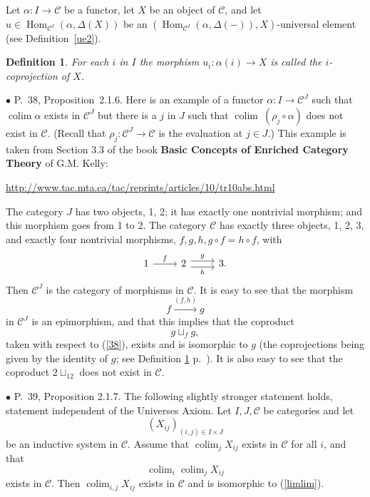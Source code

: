 \documentclass[12pt]{article}
\newtheorem{df}[thm]{Definition}%
\theoremstyle{remark}%
\newcommand{\bu}{\bullet}
\newcommand{\n}{\noindent}
\newcommand{\C}{\mathcal C}
\newcommand{\pr}{Proposition}
\DeclareMathOperator*{\coli}{colim}
\DeclareMathOperator*{\co}{colim}
\DeclareMathOperator{\h}{Hom}
\begin{document}
Let $\alpha:I\to\C$ be a functor, let $X$ be an object of $\C$, and let $u\in\h_{\C^I}(\alpha,\Delta(X))$ be an $(\h_{\C^I}(\alpha,\Delta(-)),X)$-universal element (see Definition~\ref{ue2}). 
%
\begin{df}\label{c}
For each $i$ in $I$ the morphism $u_i:\alpha(i)\to X$ is called the $i$-{\em coprojection} of $X$.
\end{df}


\n$\bu$ P.~38, \pr\ 2.1.6. Here is an example of a functor $\alpha:I\to\C^J$ such that $\co\alpha$ exists in $\C^J$ but there is a $j$ in $J$ such that $\co\ (\rho_j\circ\alpha)$ does not exist in $\C$. (Recall that $\rho_j:\C^J\to\C$ is the evaluation at $j\in J$.) This example is taken from Section 3.3 of the book \textbf{Basic Concepts of Enriched Category Theory} of G.M. Kelly:\medskip 

\centerline{\href{http://www.tac.mta.ca/tac/reprints/articles/10/tr10abs.html}{http://www.tac.mta.ca/tac/reprints/articles/10/tr10abs.html}}

The category $J$ has two objects, 1, 2; it has exactly one nontrivial morphism; and this morphism goes from 1 to 2. The category $\C$ has exactly three objects, 1, 2, 3, and exactly four nontrivial morphisms, $f,g,h,g\circ f=h\circ f$, with 
$$
\begin{tikzcd}
1\ar{r}{f}&2\ar[yshift=.7ex]{r}{g}\ar[yshift=-.7ex]{r}[swap]{h}&3.
\end{tikzcd}
$$ 
Then $\C^J$ is the category of morphisms in $\C$. It is easy to see that the morphism 
%
\begin{equation}\label{38}
f\xrightarrow{(f,h)}g 
\end{equation}
%
in $\C^J$ is an epimorphism, and that this implies that the coproduct 
$$
g\sqcup_fg,
$$ 
taken with respect to (\ref{38}), exists and is isomorphic to $g$ (the coprojections being given by the identity of $g$; see Definition \ref{c} p.~\pageref{c}). It is also easy to see that the coproduct $2\sqcup_12$ does not exist in $\C$. 


\n$\bu$ P.~39, Proposition 2.1.7. The following slightly stronger statement holds, statement independent of the Universes Axiom. Let $I, J, \C$ be categories and let 
$$
(X_{ij})_{(i,j)\in I\times J}
$$ 
be an inductive system in $\C$. Assume that $\coli_jX_{ij}$ exists in $\C$ for all $i$, and that 
\begin{equation}\label{limlim}
\coli_i\coli_jX_{ij}
\end{equation}
exists in $\C$. Then $\coli_{i,j}X_{ij}$ exists in $\C$ and is isomorphic to (\ref{limlim}).
\end{document}
